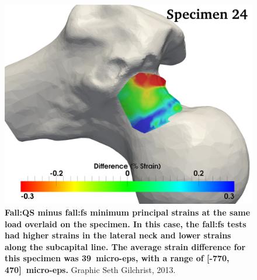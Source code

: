 
\begin{figure}
	\centering
	\includegraphics[width=0.9\linewidth]{./fracture/Figures/H1380R_FemurOverlay}
	\caption[Strain differences overlaid on an example bone]{\textbf{Fall:\ac{QS} minus fall:\ac{fs} minimum principal strains at the same load overlaid on the specimen.
	In this case, the fall:\ac{fs} tests had higher strains in the lateral neck and lower strains along the subcapital line.
	The average strain difference for this specimen was 39~\ac{micro-eps}, with a range of [-770, 470]~\ac{micro-eps}.} Graphic \textcopyright Seth Gilchrist, 2013.}
	\label{fig:H1380R_FemurOverlay}
\end{figure}

